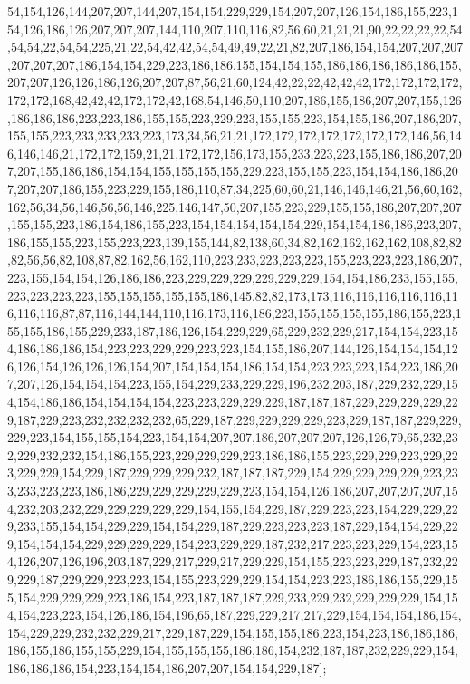 54,154,126,144,207,207,144,207,154,154,229,229,154,207,207,126,154,186,155,223,154,126,186,126,207,207,207,144,110,207,110,116,82,56,60,21,21,21,90,22,22,22,22,54,54,54,22,54,54,225,21,22,54,42,42,54,54,49,49,22,21,82,207,186,154,154,207,207,207,207,207,207,186,154,154,229,223,186,186,155,154,154,155,186,186,186,186,186,155,207,207,126,126,186,126,207,207,87,56,21,60,124,42,22,22,42,42,42,172,172,172,172,172,172,168,42,42,42,172,172,42,168,54,146,50,110,207,186,155,186,207,207,155,126,186,186,186,223,223,186,155,155,223,229,223,155,155,223,154,155,186,207,186,207,155,155,223,233,233,233,223,173,34,56,21,21,172,172,172,172,172,172,172,146,56,146,146,146,21,172,172,159,21,21,172,172,156,173,155,233,223,223,155,186,186,207,207,207,155,186,186,154,154,155,155,155,155,229,223,155,155,223,154,154,186,186,207,207,207,186,155,223,229,155,186,110,87,34,225,60,60,21,146,146,146,21,56,60,162,162,56,34,56,146,56,56,146,225,146,147,50,207,155,223,229,155,155,186,207,207,207,155,155,223,186,154,186,155,223,154,154,154,154,154,229,154,154,186,186,223,207,186,155,155,223,155,223,223,139,155,144,82,138,60,34,82,162,162,162,162,108,82,82,82,56,56,82,108,87,82,162,56,162,110,223,233,223,223,223,155,223,223,223,186,207,223,155,154,154,126,186,186,223,229,229,229,229,229,229,154,154,186,233,155,155,223,223,223,223,155,155,155,155,155,186,145,82,82,173,173,116,116,116,116,116,116,116,116,87,87,116,144,144,110,116,173,116,186,223,155,155,155,155,186,155,223,155,155,186,155,229,233,187,186,126,154,229,229,65,229,232,229,217,154,154,223,154,186,186,186,154,223,223,229,229,223,223,154,155,186,207,144,126,154,154,154,126,126,154,126,126,126,154,207,154,154,154,186,154,154,223,223,223,154,223,186,207,207,126,154,154,154,223,155,154,229,233,229,229,196,232,203,187,229,232,229,154,154,186,186,154,154,154,154,223,223,229,229,229,187,187,187,229,229,229,229,229,187,229,223,232,232,232,232,65,229,187,229,229,229,229,223,229,187,187,229,229,229,223,154,155,155,154,223,154,154,207,207,186,207,207,207,126,126,79,65,232,232,229,232,232,154,186,155,223,229,229,229,223,186,186,155,223,229,229,223,229,223,229,229,154,229,187,229,229,229,232,187,187,187,229,154,229,229,229,229,223,233,233,223,223,186,186,229,229,229,229,229,223,154,154,126,186,207,207,207,207,154,232,203,232,229,229,229,229,229,154,155,154,229,187,229,223,223,154,229,229,229,233,155,154,154,229,229,154,154,229,187,229,223,223,223,187,229,154,154,229,229,154,154,154,229,229,229,229,154,223,229,229,187,232,217,223,223,229,154,223,154,126,207,126,196,203,187,229,217,229,217,229,229,154,155,223,223,229,187,232,229,229,187,229,229,223,223,154,155,223,229,229,154,154,223,223,186,186,155,229,155,154,229,229,229,223,186,154,223,187,187,187,229,233,229,232,229,229,229,154,154,154,223,223,154,126,186,154,196,65,187,229,229,217,217,229,154,154,154,186,154,154,229,229,232,232,229,217,229,187,229,154,155,155,186,223,154,223,186,186,186,186,155,186,155,155,229,154,155,155,155,186,186,154,232,187,187,232,229,229,154,186,186,186,154,223,154,154,186,207,207,154,154,229,187];

